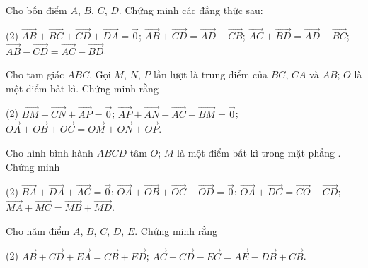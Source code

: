 \begin{vd}
	Cho bốn điểm $A$, $B$, $C$, $D$. Chứng minh các đẳng thức sau:
	\begin{tasks}(2)
		\task $\overrightarrow{AB}+\overrightarrow{BC}+\overrightarrow{CD}+\overrightarrow{DA}=\overrightarrow{0}$; 
		\task $\overrightarrow{AB}+\overrightarrow{CD}=\overrightarrow{AD}+\overrightarrow{CB}$;
		\task $\overrightarrow{AC}+\overrightarrow{BD}=\overrightarrow{AD}+\overrightarrow{BC}$;
		\task  $\overrightarrow{AB}-\overrightarrow{CD}=\overrightarrow{AC}-\overrightarrow{BD}$.
	\end{tasks}
\end{vd}

\begin{vd}
	Cho tam giác $ABC$. Gọi $M$, $N$, $P$ lần lượt là trung điểm của $BC$, $CA$ và $AB$; $O$ là một điểm bất kì. Chứng minh rằng
	\begin{tasks}(2)
		\task $\overrightarrow{BM}+\overrightarrow{CN}+\overrightarrow{AP}=\overrightarrow{0}$;
		\task $\overrightarrow{AP}+\overrightarrow{AN}-\overrightarrow{AC}+\overrightarrow{BM}=\overrightarrow{0}$;
		\task $\overrightarrow{OA}+\overrightarrow{OB}+\overrightarrow{OC}=\overrightarrow{OM}+\overrightarrow{ON}+\overrightarrow{OP}$.
	\end{tasks}
\end{vd}

\begin{vd}
	Cho hình bình hành $ABCD$ tâm $O$; $M$ là một điểm bất kì trong mặt phẳng . Chứng minh
	\begin{tasks}(2)
		\task $\overrightarrow{BA}+\overrightarrow{DA}+\overrightarrow{AC}=\overrightarrow{0}$;
		\task $\overrightarrow{OA}+\overrightarrow{OB}+\overrightarrow{OC}+\overrightarrow{OD}=\overrightarrow{0}$;
		\task $\overrightarrow{OA}+\overrightarrow{DC}=\overrightarrow{CO}-\overrightarrow{CD}$;
		\task $\overrightarrow{MA}+\overrightarrow{MC}=\overrightarrow{MB}+\overrightarrow{MD}$.
	\end{tasks}	
\end{vd}
\baitaptl
\begin{bt}
	Cho năm điểm $A$, $B$, $C$, $D$, $E$. Chứng minh rằng
	\begin{tasks}(2)
		\task $\overrightarrow{AB}+\overrightarrow{CD}+\overrightarrow{EA}=\overrightarrow{CB}+\overrightarrow{ED}$;
		\task $\overrightarrow{AC}+\overrightarrow{CD}-\overrightarrow{EC}=\overrightarrow{AE}-\overrightarrow{DB}+\overrightarrow{CB}$.
	\end{tasks}
\end{bt}

